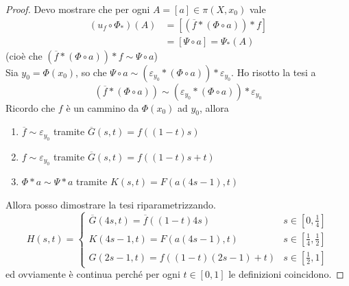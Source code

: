 \begin{proof} Devo mostrare che per ogni $A=[a]\in\pi(X,x_0)$ vale 
	\begin{align*}
	(u_f\circ \Phi_*)(A) &= [(\overline{f}*(\Phi\circ a))*f] \\
	&=[\Psi\circ a]=\Psi_*(A)
	\end{align*}
	(cioè che $(\overline{f}*(\Phi\circ a))*f \sim \Psi\circ a$) \\ 
	Sia $y_0=\Phi(x_0)$, so che $\Psi\circ a \sim (\varepsilon_{y_0}*(\Phi \circ a))*\varepsilon_{y_0}$. Ho risotto la tesi a 
	\begin{equation*}
	(\overline{f}*(\Phi\circ a))\sim (\varepsilon_{y_0}*(\Phi \circ a))*\varepsilon_{y_0}
	\end{equation*}
	Ricordo che $f$ è un cammino da $\Phi(x_0)$ ad $y_0$, allora 
	\begin{enumerate}
		\item $\overline{f}\sim \varepsilon_{y_0}$ tramite $\overline{G}(s,t)=f\left((1-t)s\right)$
		\item $f\sim \varepsilon_{y_0}$ tramite $\overline{G}(s,t)=f\left((1-t)s+t\right)$
		\item $\Phi*a \sim \Psi*a$ tramite $K(s,t)=F\left(a(4s-1),t\right)$
	\end{enumerate}
	Allora posso dimostrare la tesi riparametrizzando.
	\begin{equation*} 
	H(s,t)=
	\begin{cases}
	\overline{G}(4s,t)=\overline{f}\left((1-t)4s\right) & s \in [0,\frac{1}{4}]\\
	K(4s-1,t)=F\left(a(4s-1),t\right) & s \in [\frac{1}{4},\frac{1}{2}]\\
	G(2s-1,t)=f\left((1-t)(2s-1)+t\right) & s \in [\frac{1}{2},1]
	\end{cases}
	\end{equation*}
	ed ovviamente è continua perché per ogni $t \in [0,1]$ le definizioni coincidono.
\end{proof}

